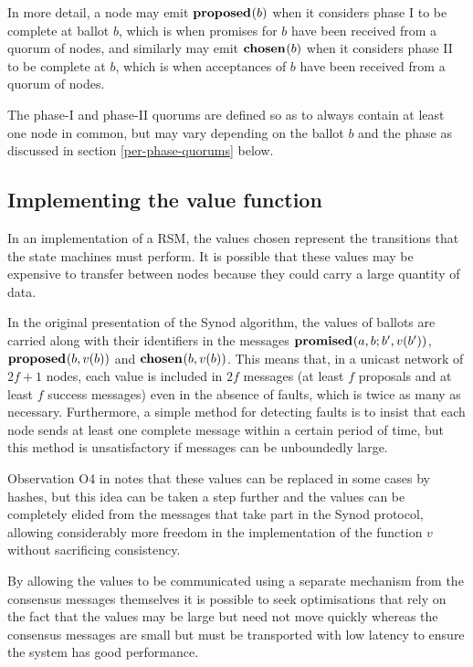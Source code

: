 \documentclass[journal]{IEEEtran}
\begin{document}
In more detail, a node may emit $\mathbf{proposed}_{}(b)$ when it considers phase I to be
complete at ballot $b$, which is when promises for $b$ have been received from
a quorum of nodes, and similarly may emit $\mathbf{chosen}_{}(b)$ when it considers
phase II to be complete at $b$, which is when acceptances of $b$ have
been received from a quorum of nodes.

The phase-I and phase-II quorums are defined so as to always contain at least
one node in common, but may vary depending on the ballot $b$ and the phase as
discussed in section \ref{per-phase-quorums} below.

\subsection{Implementing the value function}\label{value-function}

In an implementation of a RSM, the values chosen represent the transitions that
the state machines must perform. It is possible that these values may be
expensive to transfer between nodes because they could carry a large quantity
of data.

In the original presentation of the Synod algorithm, the values of ballots are
carried along with their identifiers in the messages $\mathbf{promised}_{}(a,b; b',v(b')
)$, $\mathbf{proposed}_{}( b,v(b))$ and $\mathbf{chosen}_{}( b,v(b) )$. This means that, in a unicast
network of $2f + 1$ nodes, each value is included in $2f$ messages (at least
$f$ proposals and at least $f$ success messages) even in the absence of faults,
which is twice as many as necessary. Furthermore, a simple method for detecting
faults is to insist that each node sends at least one complete message within a
certain period of time, but this method is unsatisfactory if messages can be
unboundedly large.

Observation O4 in \cite{cheap-paxos} notes that these values can be replaced in
some cases by hashes, but this idea can be taken a step further and the values
can be completely elided from the messages that take part in the Synod
protocol, allowing considerably more freedom in the implementation of the
function $v$ without sacrificing consistency.

By allowing the values to be communicated using a separate mechanism from the
consensus messages themselves it is possible to seek optimisations that rely on
the fact that the values may be large but need not move quickly whereas the
consensus messages are small but must be transported with low latency to ensure
the system has good performance.
\end{document}
